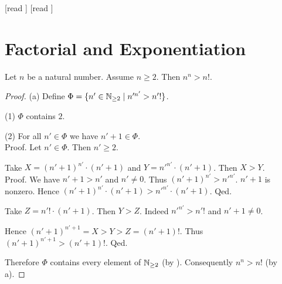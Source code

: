 \documentclass[10pt]{article}
\begin{document}
  \begin{imports}
    \begin{forthel}
      [read ]
      [read ]
    \end{forthel}
  \end{imports}


  \section*{Factorial and Exponentiation}

  \begin{forthel}
    \begin{proposition}[id=ARITHMETIC_12_8113296594960384,printid]
      Let $n$ be a natural number.
      Assume $n \geq 2$.
      Then $n^{n} > n!$.
    \end{proposition}
    \begin{proof}
      (a) Define $\Phi = \{ n' \in \mathbb{N}_{\geq 2} \mid n'^{n'} > n'! \}$.
  
      (1) $\Phi$ contains $2$.
  
      (2) For all $n' \in \Phi$ we have $n' + 1 \in \Phi$. \\
      Proof.
        Let $n' \in \Phi$.
        Then $n' \geq 2$.
  
        Take $X = (n' + 1)^{n'} \cdot (n' + 1)$ and $Y = n'^{n'} \cdot (n' + 1)$.
        Then $X > Y$. \\
        Proof.
          We have $n' + 1 > n'$ and $n' \neq 0$.
          Thus $(n' + 1)^{n'} > n'^{n'}$.
          $n' + 1$ is nonzero.
          Hence $(n' + 1)^{n'} \cdot (n' + 1) > n'^{n'} \cdot (n' + 1)$.
        Qed.
  
        Take $Z = n'! \cdot (n' + 1)$.
        Then $Y > Z$.
        Indeed $n'^{n'} > n'!$ and $n' + 1 \neq 0$.
  
        Hence $(n' + 1)^{n' + 1} = X > Y > Z = (n' + 1)!$.
        Thus $(n' + 1)^{n' + 1} > (n' + 1)!$.
      Qed.
  
      Therefore $\Phi$ contains every element of $\mathbb{N}_{\geq 2}$ (by ).
      Consequently $n^{n} > n!$ (by a).
    \end{proof}
  \end{forthel}
\end{document}
